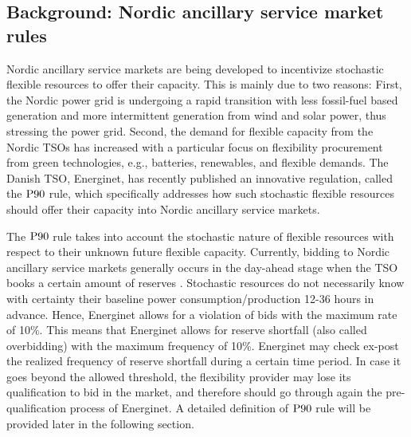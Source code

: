 \documentclass[conference]{IEEEtran}
\begin{document}

\vspace{2mm}
\subsection{Background: Nordic ancillary service market rules}\label{sec:background}
\vspace{-1mm}
Nordic ancillary service markets are being developed to incentivize stochastic flexible resources to offer their capacity. This is mainly due to two reasons: First, the Nordic power grid is undergoing a rapid transition with less fossil-fuel based generation and more intermittent generation from wind and solar power, thus stressing the power grid. Second, the demand for flexible capacity from the Nordic \acp{TSO} has increased with a particular focus on flexibility procurement from green technologies, e.g., batteries, renewables, and flexible demands. The Danish \ac{TSO}, Energinet, has recently published an innovative regulation, called the $\rm{P90}$ rule, which specifically addresses how such stochastic flexible resources should offer their capacity into Nordic ancillary service markets.

The $\rm{P90}$ rule takes into account the stochastic nature of  flexible resources with respect to their unknown future flexible capacity. Currently, bidding to Nordic ancillary service markets generally occurs in the day-ahead stage when the \ac{TSO} books a certain amount of reserves \cite{energinet}. Stochastic resources do not necessarily know with certainty their baseline power consumption/production 12-36 hours in advance. Hence, Energinet allows for a violation of bids with the maximum rate of 10\%. This means that Energinet allows for reserve shortfall (also called overbidding) with the maximum frequency of 10\%. Energinet may check ex-post the realized frequency of reserve shortfall during a certain time period. In case it goes beyond the allowed threshold, the flexibility provider may lose its qualification to bid in the market, and therefore should go through again the pre-qualification process of Energinet. A detailed definition of $\rm{P90}$ rule will be provided later in the following section. 
\end{document}
